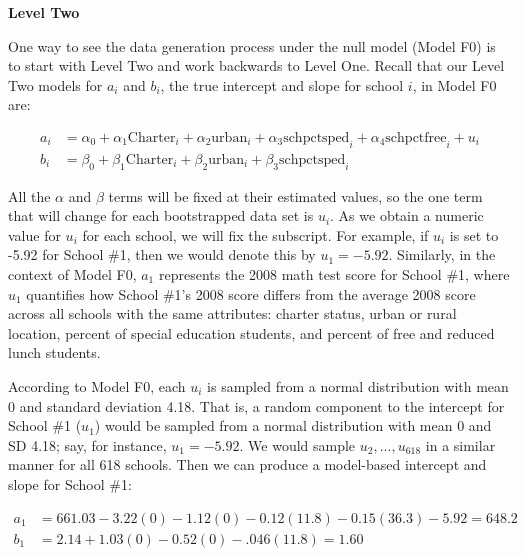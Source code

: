\documentclass[
]{krantz}
\begin{document}
\textbf{Level Two}

One way to see the data generation process under the null model (Model F0) is to start with Level Two and work backwards to Level One. Recall that our Level Two models for \(a_{i}\) and \(b_{i}\), the true intercept and slope for school \(i\), in Model F0 are:

\begin{align*}
a_{i} & = \alpha_{0} + \alpha_{1}\textrm{Charter}_i + \alpha_{2}\textrm{urban}_i + \alpha_{3}\textrm{schpctsped}_i + \alpha_{4}\textrm{schpctfree}_i + u_{i} \\
b_{i} & = \beta_{0} + \beta_{1}\textrm{Charter}_i + \beta_{2}\textrm{urban}_i + \beta_{3}\textrm{schpctsped}_i
\end{align*}

All the \(\alpha\) and \(\beta\) terms will be fixed at their estimated values, so the one term that will change for each bootstrapped data set is \(u_{i}\). As we obtain a numeric value for \(u_{i}\) for each school, we will fix the subscript. For example, if \(u_{i}\) is set to -5.92 for School \#1, then we would denote this by \(u_{1}=-5.92\). Similarly, in the context of Model F0, \(a_{1}\) represents the 2008 math test score for School \#1, where \(u_{1}\) quantifies how School \#1's 2008 score differs from the average 2008 score across all schools with the same attributes: charter status, urban or rural location, percent of special education students, and percent of free and reduced lunch students.

According to Model F0, each \(u_{i}\) is sampled from a normal distribution with mean 0 and standard deviation 4.18. That is, a random component to the intercept for School \#1 (\(u_{1}\)) would be sampled from a normal distribution with mean 0 and SD 4.18; say, for instance, \(u_{1}=-5.92\). We would sample \(u_{2},...,u_{618}\) in a similar manner for all 618 schools. Then we can produce a model-based intercept and slope for School \#1:

\begin{align*}
a_{1} & = 661.03-3.22(0)-1.12(0)-0.12(11.8)-0.15(36.3)-5.92 = 648.2 \\
b_{1} & = 2.14+1.03(0)-0.52(0)-.046(11.8) = 1.60
\end{align*}
\end{document}
